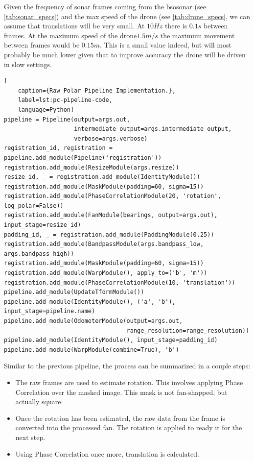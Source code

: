 Given the frequency of sonar frames coming from the \acrshort{bsosonar} (see \autoref{tab:sonar_specs}) and the max speed of the drone (see \autoref{tab:drone_specs}, we can assume that translations will be very small. At \(10Hz\) there is \(0.1s\) between frames. At the maximum speed of the drone\(1.5m/s\) the maximum movement between frames would be \(0.15m\). This is a small value indeed, but will most probably be much lower given that to improve accuracy the drone will be driven in slow settings. 

\begin{lstlisting}[
    caption={Raw Polar Pipeline Implementation.},
    label=lst:pc-pipeline-code,
    language=Python]
pipeline = Pipeline(output=args.out, 
                    intermediate_output=args.intermediate_output, 
                    verbose=args.verbose)
registration_id, registration = pipeline.add_module(Pipeline('registration'))
registration.add_module(ResizeModule(args.resize))
resize_id, _ = registration.add_module(IdentityModule())
registration.add_module(MaskModule(padding=60, sigma=15))
registration.add_module(PhaseCorrelationModule(20, 'rotation', log_polar=False))
registration.add_module(FanModule(bearings, output=args.out), input_stage=resize_id)
padding_id, _ = registration.add_module(PaddingModule(0.25))
registration.add_module(BandpassModule(args.bandpass_low, args.bandpass_high))
registration.add_module(MaskModule(padding=60, sigma=15))
registration.add_module(WarpModule(), apply_to=('b', 'm'))
registration.add_module(PhaseCorrelationModule(10, 'translation'))
pipeline.add_module(UpdateTformModule())
pipeline.add_module(IdentityModule(), ('a', 'b'), input_stage=pipeline.name)
pipeline.add_module(OdometerModule(output=args.out, 
                                   range_resolution=range_resolution))
pipeline.add_module(IdentityModule(), input_stage=padding_id)
pipeline.add_module(WarpModule(combine=True), 'b')
\end{lstlisting}

Similar to the previous pipeline, the process can be summarized in a couple steps:
\begin{itemize}
    \item The raw frames are used to estimate rotation. This involves applying Phase Correlation over the masked image. This mask is not fan-shapped, but actually square.
    \item Once the rotation has been estimated, the raw data from the frame is converted into the processed fan. The rotation is applied to ready it for the next step.
    \item Using Phase Correlation once more, translation is calculated. 
\end{itemize}

